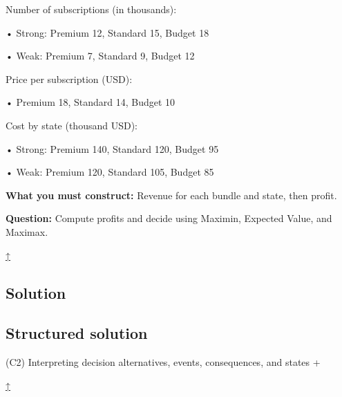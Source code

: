 \documentclass[11pt]{article}
\begin{document}
	
	
	
	
	Number of subscriptions (in thousands):
	
	
	
	• Strong: Premium 12, Standard 15, Budget 18
	
	
	
	• Weak: Premium 7, Standard 9, Budget 12
	
	
	
	
	
	Price per subscription (USD):
	
	
	
	• Premium 18, Standard 14, Budget 10
	
	
	
	
	
	Cost by state (thousand USD):
	
	
	
	• Strong: Premium 140, Standard 120, Budget 95
	
	
	
	• Weak: Premium 120, Standard 105, Budget 85
	
	
	
	
	
	
	\textbf{What you must construct:} Revenue for each bundle and state, then profit.
	
	
	
	
	
	
	\textbf{Question:} Compute profits and decide using Maximin, Expected Value, and Maximax.
	
	\hyperref[problem4-criteria]{↑}
	
	\subsection*{Solution}
	
	\label{problem4-solution}\label{problem4-criteria}
	
	\subsection*{Structured solution}
	
	
	
	
	
	(C2) Interpreting decision alternatives, events, consequences, and states
	+
	
	
	
	
	
	\hyperref[problem4-criteria]{↑}
	
	
	
\end{document}
